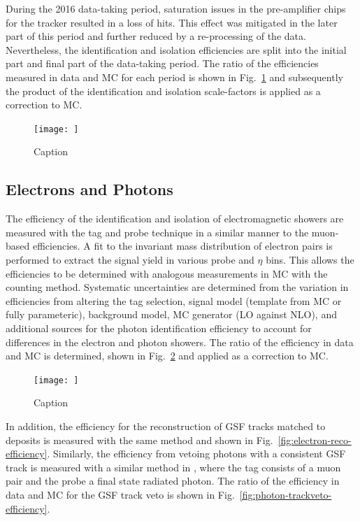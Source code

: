 During the 2016 data-taking period, saturation issues in the pre-amplifier
chips for the tracker resulted in a loss of hits. This effect was mitigated in
the later part of this period and further reduced by a re-processing of the
data. Nevertheless, the identification and isolation efficiencies are split
into the initial part and final part of the data-taking period. The ratio of
the efficiencies measured in data and MC for each period is shown in
Fig.~\ref{fig:muon-id-iso-efficiency} and subsequently the product of the
identification and isolation scale-factors is applied as a correction to MC.

\begin{figure}[htbp]
    \centering
    \texttt{[image: ]}
    \caption{Caption}
    \label{fig:muon-id-iso-efficiency}
\end{figure}


\subsection{Electrons and Photons}

The efficiency of the identification and isolation of electromagnetic showers
are measured with the tag and probe technique in a similar manner to the
muon-based efficiencies. A fit to the invariant mass distribution of electron
pairs is performed to extract the signal yield in various probe \pt and $\eta$
bins. This allows the efficiencies to be determined with analogous
measurements in MC with the counting method. Systematic uncertainties are
determined from the variation in efficiencies from altering the tag selection,
signal model (template from MC or fully parameteric), background model, MC
generator (LO against NLO), and additional sources for the photon
identification efficiency to account for differences in the electron and
photon showers. The ratio of the efficiency in data and MC is determined,
shown in Fig.~\ref{fig:egamma-id-iso-efficiency} and applied as a correction
to MC.

\begin{figure}[htbp]
    \centering
    \texttt{[image: ]}
    \caption{Caption}
    \label{fig:egamma-id-iso-efficiency}
\end{figure}

In addition, the efficiency for the reconstruction of GSF tracks matched to
\ECAL deposits is measured with the same method and shown in
Fig.~\ref{fig:electron-reco-efficiency}. Similarly, the efficiency from
vetoing photons with a consistent GSF track is measured with a similar method
in \IDYmmg, where the tag consists of a muon pair and the probe a
final state radiated photon. The ratio of the efficiency in data and MC for
the GSF track veto is shown in Fig.~\ref{fig:photon-trackveto-efficiency}.

